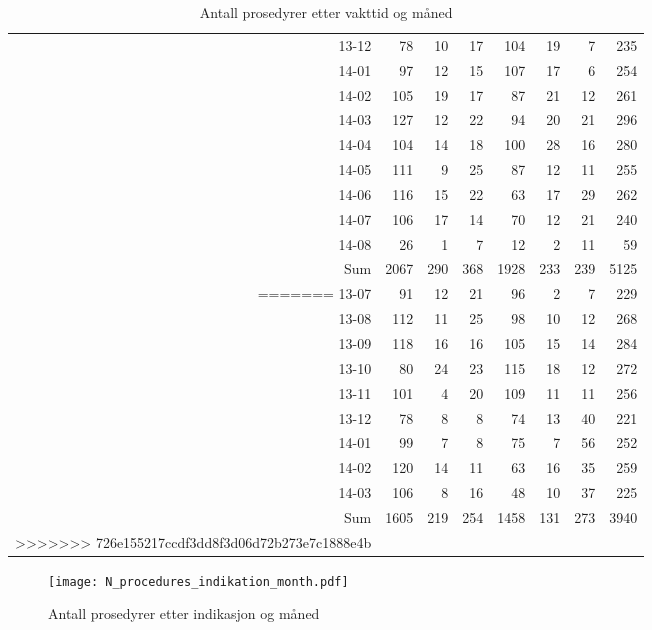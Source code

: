 \documentclass[presentation,xcolor=pdftex,dvipsnames,table]{beamer}
\begin{document}
\begin{frame}
\begin{tiny}
\begin{table}[ht]
\begin{tabular}{rrrrrrrr}
  13-12 & 78 & 10 & 17 & 104 & 19 & 7 & 235 \\ 
  14-01 & 97 & 12 & 15 & 107 & 17 & 6 & 254 \\ 
  14-02 & 105 & 19 & 17 & 87 & 21 & 12 & 261 \\ 
  14-03 & 127 & 12 & 22 & 94 & 20 & 21 & 296 \\ 
  14-04 & 104 & 14 & 18 & 100 & 28 & 16 & 280 \\ 
  14-05 & 111 & 9 & 25 & 87 & 12 & 11 & 255 \\ 
  14-06 & 116 & 15 & 22 & 63 & 17 & 29 & 262 \\ 
  14-07 & 106 & 17 & 14 & 70 & 12 & 21 & 240 \\ 
  14-08 & 26 & 1 & 7 & 12 & 2 & 11 & 59 \\ 
  Sum & 2067 & 290 & 368 & 1928 & 233 & 239 & 5125 \\ 
=======
  13-07 & 91 & 12 & 21 & 96 & 2 & 7 & 229 \\ 
  13-08 & 112 & 11 & 25 & 98 & 10 & 12 & 268 \\ 
  13-09 & 118 & 16 & 16 & 105 & 15 & 14 & 284 \\ 
  13-10 & 80 & 24 & 23 & 115 & 18 & 12 & 272 \\ 
  13-11 & 101 & 4 & 20 & 109 & 11 & 11 & 256 \\ 
  13-12 & 78 & 8 & 8 & 74 & 13 & 40 & 221 \\ 
  14-01 & 99 & 7 & 8 & 75 & 7 & 56 & 252 \\ 
  14-02 & 120 & 14 & 11 & 63 & 16 & 35 & 259 \\ 
  14-03 & 106 & 8 & 16 & 48 & 10 & 37 & 225 \\ 
  Sum & 1605 & 219 & 254 & 1458 & 131 & 273 & 3940 \\ 
>>>>>>> 726e155217ccdf3dd8f3d06d72b273e7c1888e4b
   \bottomrule
\end{tabular}
\caption{Antall prosedyrer etter vakttid og måned} 
\end{table}\end{tiny}
\end{frame}



\begin{frame}
\begin{figure}
  \centering
  \caption{Antall prosedyrer etter indikasjon og måned}
\texttt{[image: N\_procedures\_indikation\_month.pdf]}
\end{figure}\end{frame}
\end{document}
